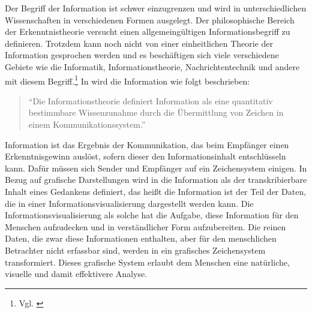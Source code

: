 \documentclass[a4paper, 12pt, DIVcalc, onepage, pdftex, headsepline, footsepline]{scrreprt}
\begin{document}
Der Begriff der Information ist schwer einzugrenzen und wird in unterschiedlichen Wissenschaften
in verschiedenen Formen ausgelegt. Der philosophische Bereich der Erkenntnistheorie versucht
einen allgemeingültigen Informationsbegriff zu definieren. Trotzdem kann noch nicht von einer
einheitlichen Theorie der Information gesprochen werden und es beschäftigen sich viele verschiedene
Gebiete wie die Informatik, Informationstheorie, Nachrichtentechnik und andere mit diesem
Begriff.\footnote{Vgl. \citep{wiki_info}} In \citep[S.\,3]{Hoeher} wird die Information wie folgt beschrieben:
\begin{quote}
"`Die Informationstheorie definiert Information als eine quantitativ bestimmbare Wissenzunahme durch
die Übermittlung von Zeichen in einem Kommunikationssystem."'
\end{quote}
Information ist das Ergebnis der Kommunikation, das beim Empfänger einen Erkenntnisgewinn auslöst,
sofern dieser den Informationsinhalt entschlüsseln kann. Dafür müssen sich Sender und Empfänger
auf ein Zeichensystem einigen.
In Bezug auf grafische Darstellungen wird in \citep{Bertin} die Information als der transkribierbare
Inhalt eines Gedankens definiert, das heißt die Information ist der Teil der Daten, die in einer
Informationsvisualisierung dargestellt werden kann. Die Informationsvisualisierung als solche hat die
Aufgabe, diese Information für den Menschen aufzudecken und in verständlicher Form aufzubereiten.
Die reinen Daten, die zwar diese Informationen enthalten,
aber für den menschlichen Betrachter nicht erfassbar sind, werden in ein grafisches
Zeichensystem transformiert. Dieses grafische System erlaubt dem Menschen eine natürliche, visuelle und
damit effektivere Analyse.
\end{document}
